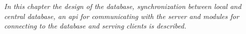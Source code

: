 \emph{In this chapter the design of the database, synchronization between local and central database, an \ac{api} for communicating with the server and modules for connecting to the database and serving clients is described.}
